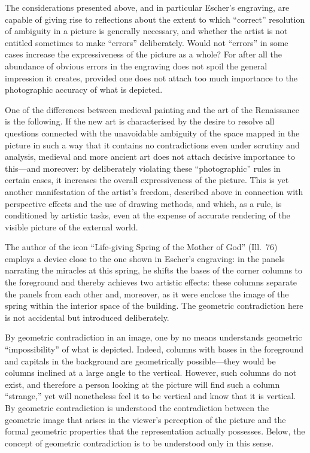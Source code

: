 The considerations presented above, and in particular Escher's engraving, are capable of
giving rise to reflections about the extent to which ``correct'' resolution of ambiguity
in a picture is generally necessary, and whether the artist is not entitled sometimes to
make ``errors'' deliberately.  Would not ``errors'' in some cases increase the
expressiveness of the picture as a whole?  For after all the abundance of obvious errors
in the engraving does not spoil the general impression it creates, provided one does not
attach too much importance to the photographic accuracy of what is depicted.

One of the differences between medieval painting and the art of the Renaissance is the
following.  If the new art is characterised by the desire to resolve all questions
connected with the unavoidable ambiguity of the space mapped in the picture in such a
way that it contains no contradictions even under scrutiny and analysis, medieval and
more ancient art does not attach decisive importance to this---and moreover: by
deliberately violating these ``photographic'' rules in certain cases, it increases the
overall expressiveness of the picture.  This is yet another manifestation of the
artist's freedom, described above in connection with perspective effects and the use of
drawing methods, and which, as a rule, is conditioned by artistic tasks, even at the
expense of accurate rendering of the visible picture of the external world.



The author of the icon ``Life-giving Spring of the Mother of God'' (Ill.~76) employs a
device close to the one shown in Escher's engraving: in the panels narrating the miracles
at this spring, he shifts the bases of the corner columns to the foreground and thereby
achieves two artistic effects: these columns separate the panels from each other and,
moreover, as it were enclose the image of the spring within the interior space of the
building.  The geometric contradiction here is not accidental but introduced deliberately.

By geometric contradiction in an image, one by no means understands geometric
``impossibility'' of what is depicted.  Indeed, columns with bases in the foreground and
capitals in the background are geometrically possible---they would be columns inclined
at a large angle to the vertical.  However, such columns do not exist, and therefore a
person looking at the picture will find such a column ``strange,'' yet will nonetheless
feel it to be vertical and know that it is vertical.  By geometric contradiction is
understood the contradiction between the geometric image that arises in the viewer's
perception of the picture and the formal geometric properties that the representation
actually possesses.  Below, the concept of geometric contradiction is to be understood
only in this sense.


